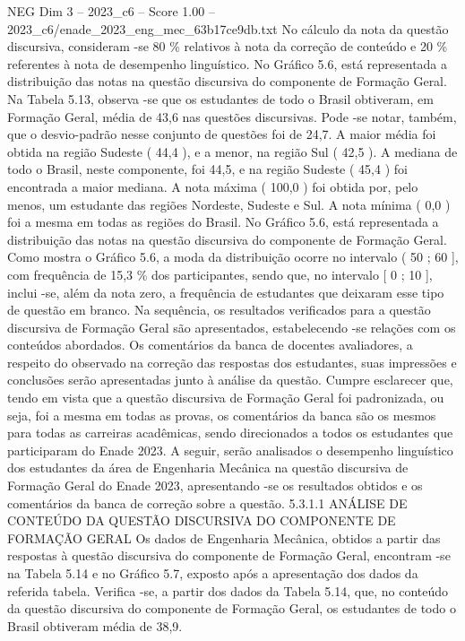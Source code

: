 \begin{textsample}{NEG Dim 3 – 2023\_c6 – Score 1.00 – 2023\_c6/enade\_2023\_eng\_mec\_63b17ce9db.txt}
No cálculo da nota da questão discursiva, consideram -se 80 \% relativos à nota da correção de conteúdo e 20 \% referentes à nota de desempenho linguístico.
No Gráfico 5.6, está representada a distribuição das notas na questão discursiva do componente de Formação Geral.
Na Tabela 5.13, observa -se que os estudantes de todo o Brasil obtiveram, em Formação Geral, média de 43,6 nas questões discursivas.
Pode -se notar, também, que o desvio-padrão nesse conjunto de questões foi de 24,7.
A maior média foi obtida na região Sudeste ( 44,4 ), e a menor, na região Sul ( 42,5 ).
A mediana de todo o Brasil, neste componente, foi 44,5, e na região Sudeste ( 45,4 ) foi encontrada a maior mediana.
A nota máxima ( 100,0 ) foi obtida por, pelo menos, um estudante das regiões Nordeste, Sudeste e Sul.
A nota mínima ( 0,0 ) foi a mesma em todas as regiões do Brasil.
No Gráfico 5.6, está representada a distribuição das notas na questão discursiva do componente de Formação Geral.
Como mostra o Gráfico 5.6, a moda da distribuição ocorre no intervalo ( 50 ; 60 ], com frequência de 15,3 \% dos participantes, sendo que, no intervalo [ 0 ; 10 ], inclui -se, além da nota zero, a frequência de estudantes que deixaram esse tipo de questão em branco.
Na sequência, os resultados verificados para a questão discursiva de Formação Geral são apresentados, estabelecendo -se relações com os conteúdos abordados.
Os comentários da banca de docentes avaliadores, a respeito do observado na correção das respostas dos estudantes, suas impressões e conclusões serão apresentadas junto à análise da questão.
Cumpre esclarecer que, tendo em vista que a questão discursiva de Formação Geral foi padronizada, ou seja, foi a mesma em todas as provas, os comentários da banca são os mesmos para todas as carreiras acadêmicas, sendo direcionados a todos os estudantes que participaram do Enade 2023.
A seguir, serão analisados o desempenho linguístico dos estudantes da área de Engenharia Mecânica na questão discursiva de Formação Geral do Enade 2023, apresentando -se os resultados obtidos e os comentários da banca de correção sobre a questão. 5.3.1.1 ANÁLISE DE CONTEÚDO DA QUESTÃO DISCURSIVA DO COMPONENTE DE FORMAÇÃO GERAL Os dados de Engenharia Mecânica, obtidos a partir das respostas à questão discursiva do componente de Formação Geral, encontram -se na Tabela 5.14 e no Gráfico 5.7, exposto após a apresentação dos dados da referida tabela.
Verifica -se, a partir dos dados da Tabela 5.14, que, no conteúdo da questão discursiva do componente de Formação Geral, os estudantes de todo o Brasil obtiveram média de 38,9.

\end{textsample}
